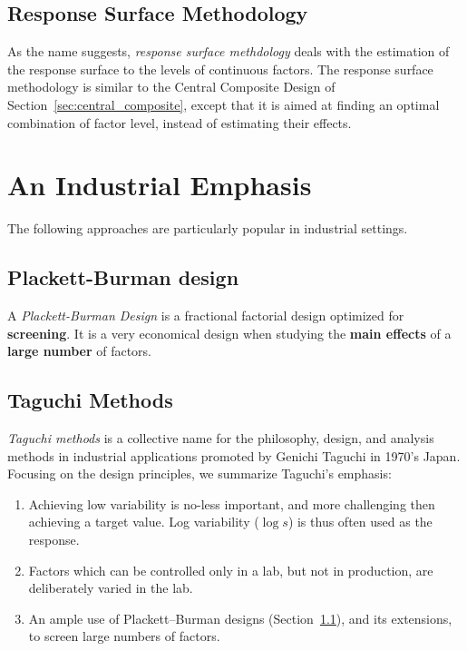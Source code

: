 \subsection{Response Surface Methodology}
\label{sec:response_surface}

As the name suggests, \emph{response surface methdology} deals with the estimation of the response surface to the levels of continuous factors.
The response surface methodology is similar to the Central Composite Design of Section~\ref{sec:central_composite}, except that it is aimed at finding an optimal combination of factor level, instead of estimating their effects. 








\section{An Industrial Emphasis}
The following approaches are particularly popular in industrial settings.

\subsection{Plackett-Burman design}
\label{sec:plackett_burman}

A \emph{Plackett-Burman Design} is a fractional factorial design optimized for \textbf{screening}. 
It is a very economical design when studying the \textbf{main effects} of a \textbf{large number} of factors. 



\subsection{Taguchi Methods}
\emph{Taguchi methods} is a collective name for the philosophy, design, and analysis methods in industrial applications promoted by Genichi Taguchi in 1970's Japan.
Focusing on the design principles, we summarize Taguchi's emphasis:

\begin{enumerate}

\item Achieving low variability is no-less important, and more challenging then achieving a target value. 
Log variability ($\log s$) is thus often used as the response.

\item Factors which can be controlled only in a lab, but not in production, are deliberately varied in the lab. 

\item An ample use of Plackett–Burman designs (Section~\ref{sec:plackett_burman}), and its extensions, to screen large numbers of factors. 

\end{enumerate}





